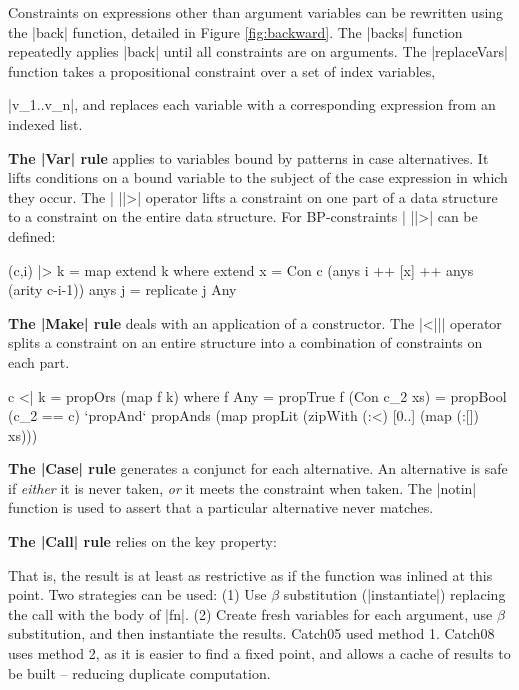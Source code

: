 \documentclass[preprint]{sigplanconf}
\newcommand{\para}[1]{\vspace{2mm}\noindent\textbf{#1}}
\begin{document}
Constraints on expressions other than argument variables can be rewritten using the |back| function, detailed in Figure \ref{fig:backward}. The |backs| function repeatedly applies |back| until all constraints are on arguments. The |replaceVars| function takes a propositional constraint over a set of index variables, \ignore|v_1..v_n|, and replaces each variable with a corresponding expression from an indexed list.

\para{The |Var| rule} applies to variables bound by patterns in case alternatives. It lifts conditions on a bound variable to the subject of the case expression in which they occur. The | ||>| operator lifts a constraint on one part of a data structure to a constraint on the entire data structure. For BP-constraints | ||>| can be defined:

\begin{code}
(c,i) |> k = map extend k
    where
    extend x = Con c (anys i ++ [x] ++ anys (arity c-i-1))
    anys j = replicate j Any
\end{code}

\para{The |Make| rule} deals with an application of a constructor. The |<||| operator splits a constraint on an entire structure into a combination of constraints on each part.

\begin{code}
c <| k = propOrs (map f k)
    where
    f Any = propTrue
    f (Con c_2 xs) = propBool (c_2 == c) `propAnd`
        propAnds (map propLit (zipWith (:<) [0..] (map (:[]) xs)))
\end{code}

\para{The |Case| rule} generates a conjunct for each alternative. An alternative is safe if \textit{either} it is never taken, \textit{or} it meets the constraint when taken. The |notin| function is used to assert that a particular alternative never matches.

\para{The |Call| rule} relies on the key property:


That is, the result is at least as restrictive as if the function was inlined at this point. Two strategies can be used: (1) Use $\beta$ substitution (|instantiate|) replacing the call with the body of |fn|. (2) Create fresh variables for each argument, use $\beta$ substitution, and then instantiate the results. Catch05 used method 1. Catch08 uses method 2, as it is easier to find a fixed point, and allows a cache of results to be built -- reducing duplicate computation.
\end{document}
